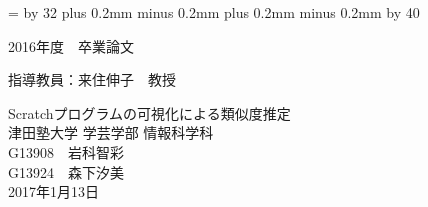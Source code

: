 \documentclass[a4paper,10pt,onecolumn,oneside,openany]{jsbook}
\def\linesparpage#1{\baselineskip=\textheight
   \divide\baselineskip by #1}
\def\kcharparline#1{%
   \ifx\xkanjiskip\undefined%
   \jintercharskip 0mm plus 0.2mm minus 0.2mm
   \else
   \xkanjiskip 0mm plus 0.2mm minus 0.2mm
   \fi
   \settowidth{\textwidth}{あ}%
   \multiply\textwidth by #1}
\begin{document}
\linesparpage{32} %
\kcharparline{40} %
\begin{titlepage}
\begin{flushleft}
{\large
2016年度　卒業論文 \\ 
}
\end{flushleft}
\begin{flushright}
{\large
指導教員：来住伸子　教授 \\ %
}
\end{flushright}

\begin{center}
\vspace{150truept}
{\huge Scratchプログラムの可視化による類似度推定}\\ %


\vspace{80truept}
{\huge 津田塾大学 学芸学部 情報科学科}\\
\vspace{30truept}
{\huge G13908　岩科智彩}\\ %
\vspace{10truept}
{\huge G13924　森下汐美}\\ %
\vspace{50truept}
{\huge 2017年1月13日}\\ %
\end{center}
\end{titlepage}
\end{document}
